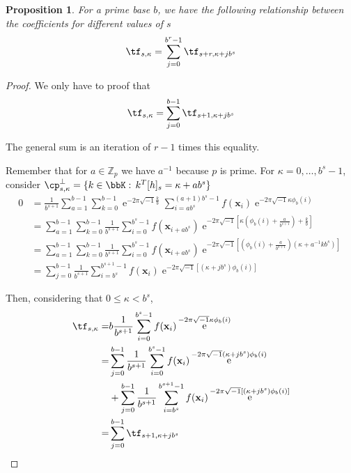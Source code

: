 \documentclass[]{elsarticle}
\DeclareMathOperator{\e}{e}
\newcommand{\cfourier}[1]{\ensuremath{\e^{-2\pi\sqrt{-1}#1}}}
\newtheorem{prop}[theorem]{Proposition}
\theoremstyle{definition}
\theoremstyle{remark}
\begin{document}
\begin{prop}
For a prime base $b$, we have the following relationship between the coefficients for different values of $s$
\begin{equation}
\tf_{s,\kappa}=\sum_{j=0}^{b^r-1}\tf_{s+r,\kappa+jb^s}
\end{equation}
\end{prop}
\begin{proof}
We only have to proof that
\begin{equation}\label{proof_sum}
\tf_{s,\kappa}=\sum_{j=0}^{b-1}\tf_{s+1,\kappa+jb^s}
\end{equation}

The general sum is an iteration of $r-1$ times this equality.

Remember that for $a\in\mathbb{Z}_p$ we have $a^{-1}$ because $p$ is prime. For $\kappa=0,\dots,b^s-1$, consider $\cp^{\perp}_{s,\kappa}=\{k\in\bbK:\,k^T[h]_s=\kappa+ab^s\}$
\begin{equation}
\begin{split}
0&=\frac{1}{b^{s+1}}\sum_{a=1}^{b-1}\sum_{k=0}^{b-1}\cfourier{\frac{k}{b}}\sum_{i=ab^s}^{(a+1)b^s-1}f(\mathbf{x}_i)\cfourier{\kappa\phi_b(i)}\\
&=\sum_{a=1}^{b-1}\sum_{k=0}^{b-1}\frac{1}{b^{s+1}}\sum_{i=0}^{b^s-1}f(\mathbf{x}_{i+ab^s})\cfourier{\left[\kappa\left(\phi_b(i)+\frac{a}{b^{s+1}}\right)+\frac{k}{b}\right]}\\
&=\sum_{a=1}^{b-1}\sum_{k=0}^{b-1}\frac{1}{b^{s+1}}\sum_{i=0}^{b^s-1}f(\mathbf{x}_{i+ab^s})\cfourier{\left[\left(\phi_b(i)+\frac{a}{b^{s+1}}\right)\left(\kappa+a^{-1}kb^s\right)\right]}\\
&=\sum_{j=0}^{b-1}\frac{1}{b^{s+1}}\sum_{i=b^s}^{b^{s+1}-1}f(\mathbf{x}_{i})\cfourier{\left[\left(\kappa+jb^s\right)\phi_b(i)\right]}
\end{split}
\end{equation}

Then, considering that $0\leq \kappa<b^s$,
\begin{equation}
\begin{split}
\tf_{s,\kappa}=&b\frac{1}{b^{s+1}}\sum_{i=0}^{b^s-1}f(\mathbf{x}_i)\cfourier{\kappa\phi_b(i)}\\
=&\sum_{j=0}^{b-1}\frac{1}{b^{s+1}}\sum_{i=0}^{b^s-1}f(\mathbf{x}_i)\cfourier{\left(\kappa+jb^s\right)\phi_b(i)}\\
&+\sum_{j=0}^{b-1}\frac{1}{b^{s+1}}\sum_{i=b^s}^{b^{s+1}-1}f(\mathbf{x}_{i})\cfourier{\left[\left(\kappa+jb^s\right)\phi_b(i)\right]}\\
=&\sum_{j=0}^{b-1}\tf_{s+1,\kappa+jb^s}
\end{split}
\end{equation}
\end{proof}
\end{document}
